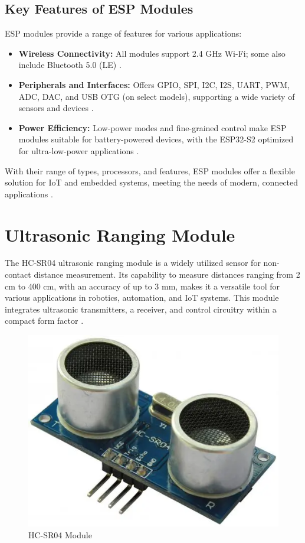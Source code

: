 \subsection{Key Features of ESP Modules}

ESP modules provide a range of features for various applications:

\begin{itemize}
	\item \textbf{Wireless Connectivity:} All modules support 2.4 GHz Wi-Fi; some also include Bluetooth 5.0 (LE) \cite{EspressifModules}.
	
	\item \textbf{Peripherals and Interfaces:} Offers GPIO, SPI, I2C, I2S, UART, PWM, ADC, DAC, and USB OTG (on select models), supporting a wide variety of sensors and devices \cite{EspressifModules}.
	
	\item \textbf{Power Efficiency:} Low-power modes and fine-grained control make ESP modules suitable for battery-powered devices, with the ESP32-S2 optimized for ultra-low-power applications \cite{EspressifModules}.
\end{itemize}

With their range of types, processors, and features, ESP modules offer a flexible solution for IoT and embedded systems, meeting the needs of modern, connected applications \cite{EspressifModules}.

\section{Ultrasonic Ranging Module}



The HC-SR04 ultrasonic ranging module is a widely utilized sensor for non-contact distance measurement. Its capability to measure distances ranging from 2 cm to 400 cm, with an accuracy of up to 3 mm, makes it a versatile tool for various applications in robotics, automation, and IoT systems. This module integrates ultrasonic transmitters, a receiver, and control circuitry within a compact form factor  \cite{HCSR04Datasheet}.

\begin{figure}
	\centering
	\includegraphics[width=0.4\linewidth]{assets/ch2/ultrasonic}
	\caption{HC-SR04 Module}
	\label{fig:ultrasonic}
\end{figure}


